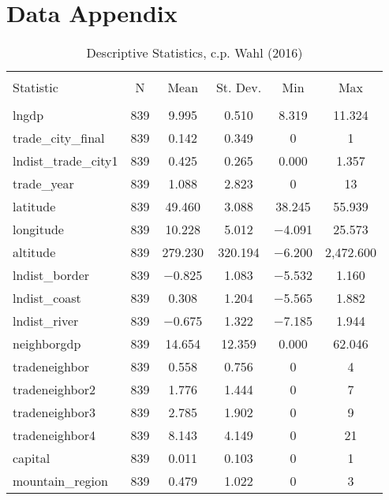
\chapter{Data Appendix} %

\label{AppendixA} %

\begin{table}[!htbp] \centering 
  \caption{Descriptive Statistics, c.p. Wahl (2016)} 
  \label{} 
\begin{tabular}{@{\extracolsep{5pt}}lccccc} 
\\[-1.8ex]\hline 
\hline \\[-1.8ex] 
Statistic & \multicolumn{1}{c}{N} & \multicolumn{1}{c}{Mean} & \multicolumn{1}{c}{St. Dev.} & \multicolumn{1}{c}{Min} & \multicolumn{1}{c}{Max} \\ 
\hline \\[-1.8ex] 
lngdp & 839 & 9.995 & 0.510 & 8.319 & 11.324 \\ 
trade\_city\_final & 839 & 0.142 & 0.349 & 0 & 1 \\ 
lndist\_trade\_city1 & 839 & 0.425 & 0.265 & 0.000 & 1.357 \\ 
trade\_year & 839 & 1.088 & 2.823 & 0 & 13 \\ 
latitude & 839 & 49.460 & 3.088 & 38.245 & 55.939 \\ 
longitude & 839 & 10.228 & 5.012 & $-$4.091 & 25.573 \\ 
altitude & 839 & 279.230 & 320.194 & $-$6.200 & 2,472.600 \\ 
lndist\_border & 839 & $-$0.825 & 1.083 & $-$5.532 & 1.160 \\ 
lndist\_coast & 839 & 0.308 & 1.204 & $-$5.565 & 1.882 \\ 
lndist\_river & 839 & $-$0.675 & 1.322 & $-$7.185 & 1.944 \\ 
neighborgdp & 839 & 14.654 & 12.359 & 0.000 & 62.046 \\ 
tradeneighbor & 839 & 0.558 & 0.756 & 0 & 4 \\ 
tradeneighbor2 & 839 & 1.776 & 1.444 & 0 & 7 \\ 
tradeneighbor3 & 839 & 2.785 & 1.902 & 0 & 9 \\ 
tradeneighbor4 & 839 & 8.143 & 4.149 & 0 & 21 \\ 
capital & 839 & 0.011 & 0.103 & 0 & 1 \\ 
mountain\_region & 839 & 0.479 & 1.022 & 0 & 3 \\ 

\end{tabular}
\end{table}
